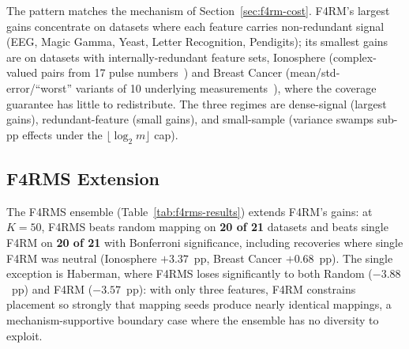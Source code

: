 The pattern matches the mechanism of Section~\ref{sec:f4rm-cost}. F4RM's largest gains concentrate on datasets where each feature carries non-redundant signal (EEG, Magic Gamma, Yeast, Letter Recognition, Pendigits); its smallest gains are on datasets with internally-redundant feature sets, Ionosphere (complex-valued pairs from 17 pulse numbers~\cite{sigillito1989classification}) and Breast Cancer (mean/std-error/``worst'' variants of 10 underlying measurements~\cite{street1993nuclear}), where the coverage guarantee has little to redistribute. The three regimes are dense-signal (largest gains), redundant-feature (small gains), and small-sample (variance swamps sub-pp effects under the $\lfloor \log_2 m \rfloor$ cap).

\subsection{F4RMS Extension}
\label{sec:results-f4rms}

The F4RMS ensemble (Table~\ref{tab:f4rms-results}) extends F4RM's gains: at $K = 50$, F4RMS beats random mapping on \textbf{20 of 21} datasets and beats single F4RM on \textbf{20 of 21} with Bonferroni significance, including recoveries where single F4RM was neutral (Ionosphere $+3.37$~pp, Breast Cancer $+0.68$~pp). The single exception is Haberman, where F4RMS loses significantly to both Random ($-3.88$~pp) and F4RM ($-3.57$~pp): with only three features, F4RM constrains placement so strongly that mapping seeds produce nearly identical mappings, a mechanism-supportive boundary case where the ensemble has no diversity to exploit.

